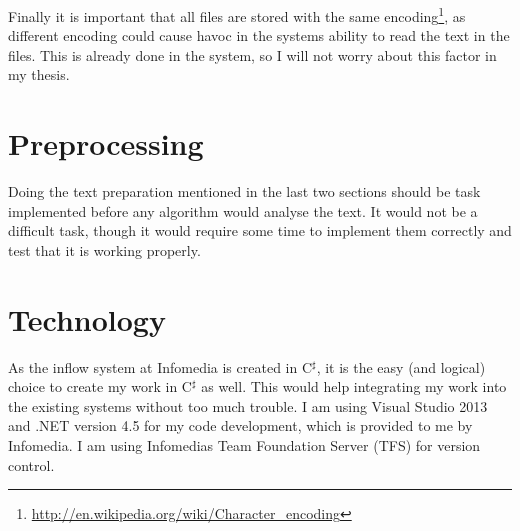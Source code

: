 Finally it is important that all files are stored with the same encoding\footnote{\url{http://en.wikipedia.org/wiki/Character_encoding}}, as different encoding could cause havoc in the systems ability to read the text in the files. This is already done in the system, so I will not worry about this factor in my thesis.

\section{Preprocessing}
Doing the text preparation mentioned in the last two sections should be task implemented before any algorithm would analyse the text. It would not be a difficult task, though it would require some time to implement them correctly and test that it is working properly.

\section{Technology}
As the inflow system at Infomedia is created in C$^\sharp$, it is the easy (and logical) choice to create my work in C$^\sharp$ as well. This would help integrating my work into the existing systems without too much trouble. I am using Visual Studio 2013 and .NET version 4.5 for my code development, which is provided to me by Infomedia. I am using Infomedias Team Foundation Server (TFS) for version control. 








